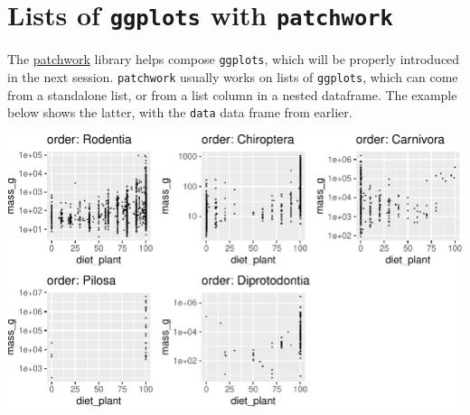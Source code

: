 \documentclass[]{book}
\newenvironment{Shaded}{}{}
\newcommand{\CommentTok}[1]{\textcolor[rgb]{0.38,0.63,0.69}{\textit{#1}}}
\newcommand{\KeywordTok}[1]{\textcolor[rgb]{0.00,0.44,0.13}{\textbf{#1}}}
\newcommand{\NormalTok}[1]{#1}
\newcommand{\OperatorTok}[1]{\textcolor[rgb]{0.40,0.40,0.40}{#1}}
\begin{document}
\hypertarget{lists-of-ggplots-with-patchwork}{%
\section{\texorpdfstring{Lists of \texttt{ggplots} with \texttt{patchwork}}{Lists of ggplots with patchwork}}\label{lists-of-ggplots-with-patchwork}}

The \href{https://patchwork.data-imaginist.com/}{patchwork} library helps compose \texttt{ggplots}, which will be properly introduced in the next session. \texttt{patchwork} usually works on lists of \texttt{ggplots}, which can come from a standalone list, or from a list column in a nested dataframe.
The example below shows the latter, with the \texttt{data} data frame from earlier.

\begin{Shaded}
\end{Shaded}

\begin{center}\includegraphics[width=\textwidth]{TRES-Tidy-Tutorial_files/figure-latex/unnamed-chunk-104-1} \end{center}
\end{document}
